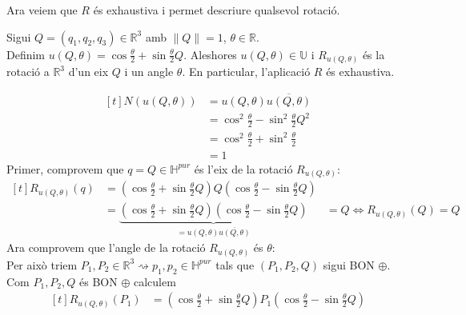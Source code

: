 \documentclass[a4paper,12pt]{article}
\begin{document}
	Ara veiem que $R$ és exhaustiva i permet descriure qualsevol rotació.
	\begin{teorema}
		Sigui $Q = (q_1, q_2, q_3) \in \mathbb{R}^3$ amb $\left\lVert Q \right\rVert = 1$, $\theta \in \mathbb{R}$.\\
		Definim $u(Q, \theta) = \cos{\frac{\theta}{2}} + \sin{\frac{\theta}{2}}Q$. Aleshores $u(Q, \theta) \in \mathbb{U}$ i $R_{u(Q, \theta)}$ és la rotació a $\mathbb{R}^3$ d'un eix $Q$ i un angle $\theta$. En particular, l'aplicació $R$ és exhaustiva.
	\end{teorema}
	\begin{demostracio}
		\begin{displaymath}
			\begin{aligned}[t]
				N(u(Q, \theta)) &= u(Q, \theta) \overline{u(Q, \theta)}\\
								&= \cos^2{\frac{\theta}{2}} - \sin^2{\frac{\theta}{2}} Q^2\\
								&= \cos^2{\frac{\theta}{2}} + \sin^2{\frac{\theta}{2}}\\
								&= 1
			\end{aligned}
		\end{displaymath}
		Primer, comprovem que $q = Q \in \mathbb{H}^{pur}$ és l'eix de la rotació $R_{u(Q, \theta)}$:\\
		\begin{displaymath}
			\begin{aligned}[t]
				R_{u(Q, \theta)}(q) &= (\cos{\frac{\theta}{2}} + \sin{\frac{\theta}{2}}Q)Q(\cos{\frac{\theta}{2}} - \sin{\frac{\theta}{2}}Q)\\
									&= \underbrace{(\cos{\frac{\theta}{2}} + \sin{\frac{\theta}{2}}Q)(\cos{\frac{\theta}{2}} - \sin{\frac{\theta}{2}}Q)}_{ = u(Q, \theta)\overline{u(Q, \theta)}}
									&= Q \iff R_{u(Q, \theta)}(Q) = Q
			\end{aligned}
		\end{displaymath}
		Ara comprovem que l'angle de la rotació $R_{u(Q,\theta)}$ és $\theta$:\\
		Per això triem $P_1, P_2 \in \mathbb{R}^3 \rightsquigarrow p_1, p_2 \in \mathbb{H}^{pur}$ tals que $(P_1, P_2, Q)$ sigui BON $\oplus$.\\
		Com $P_1, P_2, Q$ és BON $\oplus$ calculem
		\begin{displaymath}
			\begin{aligned}[t]
				R_{u(Q, \theta)}(P_1)
									&= (\cos{\frac{\theta}{2}} + \sin{\frac{\theta}{2}}Q)P_1(\cos{\frac{\theta}{2}} - \sin{\frac{\theta}{2}}Q)\\

\end{aligned}
\end{displaymath}
\end{demostracio}
\end{document}
